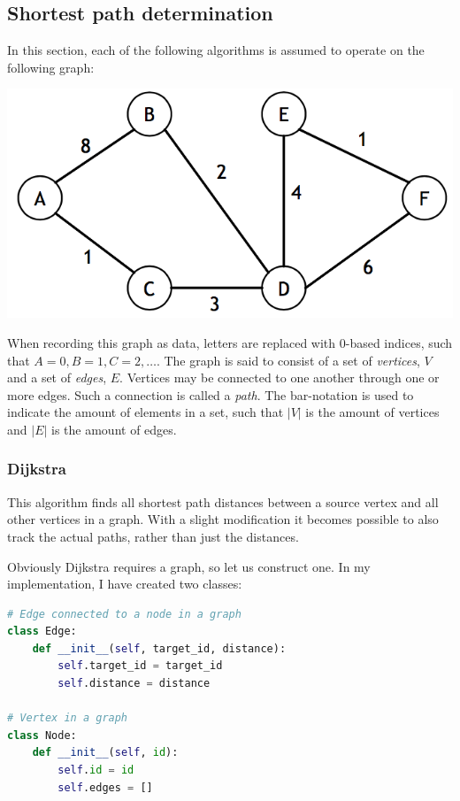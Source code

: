 \documentclass{article}
\begin{document}
\newpage

\subsection{Shortest path determination}
In this section, each of the following algorithms is assumed to operate on the following graph:

\includegraphics[width=\textwidth]{sample_graph}

When recording this graph as data, letters are replaced with 0-based indices, such that \(A=0, B=1, C=2, \dots\). The graph is said to consist of a set of {\em vertices}, \(V\) and a set of {\em edges}, \(E\). Vertices may be connected to one another through one or more edges. Such a connection is called a {\em path}.
The bar-notation is used to indicate the amount of elements in a set, such that \(|V|\) is the amount of vertices and \(|E|\) is the amount of edges.

\subsubsection{Dijkstra}
This algorithm finds all shortest path distances between a source vertex and all other vertices in a graph.
With a slight modification it becomes possible to also track the actual paths, rather than just the distances.

Obviously Dijkstra requires a graph, so let us construct one.
In my implementation, I have created two classes:

\begin{lstlisting}[language=Python]
# Edge connected to a node in a graph
class Edge:
    def __init__(self, target_id, distance):
        self.target_id = target_id
        self.distance = distance

# Vertex in a graph
class Node:
    def __init__(self, id):
        self.id = id
        self.edges = []
\end{lstlisting}
\end{document}
